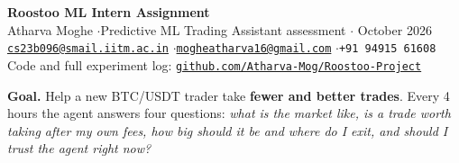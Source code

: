 \documentclass[10pt,a4paper]{article}
\begin{document}
\begin{center}
{\LARGE\bfseries Roostoo ML Intern Assignment}\\[4pt]
{\small Atharva Moghe \quad$\cdot$\quad Predictive ML Trading Assistant assessment \quad$\cdot$ October 2026}\\[2pt]
{\small \href{mailto:cs23b096@smail.iitm.ac.in}{\texttt{cs23b096@smail.iitm.ac.in}} \quad$\cdot$\quad \href{mailto:mogheatharva16@gmail.com}{\texttt{mogheatharva16@gmail.com}} \quad$\cdot$\quad \texttt{+91 94915 61608}}\\[2pt]
{\small Code and full experiment log: \href{https://github.com/Atharva-Mog/Roostoo-Project}{\texttt{github.com/Atharva-Mog/Roostoo-Project}}}
\end{center}

\textbf{Goal.} Help a new BTC/USDT trader take \textbf{fewer and better trades}. Every 4 hours the agent answers four questions:
\emph{what is the market like, is a trade worth taking after my own fees, how big should it be and where do I exit, and should I
trust the agent right now?}
\end{document}
